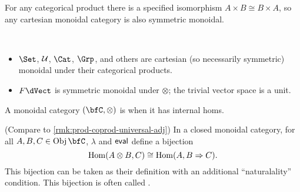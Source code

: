 \documentclass[a5paper]{article}
\begin{document}
\begin{remark}
	For any categorical product there is a specified isomorphism
  $A\times B\cong B\times A$, so any cartesian monoidal category is also
  symmetric monoidal.
\end{remark}

\begin{example}
  \
  \begin{itemize}
    \itemsep-0.2em
    \item \vspace{-0.3em} $\Set$, $\mathcal{U}$, $\Cat$, $\Grp$, and others are 
      cartesian (so necessarily symmetric) monoidal under their categorical
      products. 
    \item $F\dVect$ is symmetric monoidal under $\otimes $; the trivial vector
      space is a unit.
  \end{itemize}
\end{example}


\begin{definition}
  A monoidal category $(\bfC,\otimes )$ is  when it has internal
  homs.
\end{definition}

\begin{remark}
  (Compare to \cref{rmk:prod-coprod-universal-adj})
  In a closed monoidal category, for all $A,B,C\in\Obj\bfC$,
  $\lambda$ and $\mathsf{eval}$ define a bijection
  \begin{equation*}
    \operatorname{Hom}(A\otimes B,C)\cong \operatorname{Hom}(A,B\Rightarrow C).
  \end{equation*}
  This bijection can be taken as their definition
  with an additional ``naturalality'' condition.
  This bijection is often called .
\end{remark}
\end{document}
